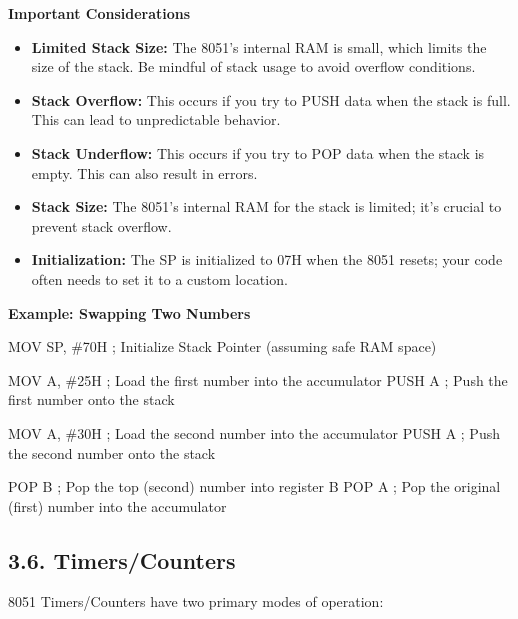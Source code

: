 \documentclass[
]{article}
\newenvironment{Shaded}{}{}
\newcommand{\NormalTok}[1]{#1}
\begin{document}
\textbf{Important Considerations}

\begin{itemize}
\item
  \textbf{Limited Stack Size:} The 8051's internal RAM is small, which
  limits the size of the stack. Be mindful of stack usage to avoid
  overflow conditions.
\item
  \textbf{Stack Overflow:} This occurs if you try to PUSH data when the
  stack is full. This can lead to unpredictable behavior.
\item
  \textbf{Stack Underflow:} This occurs if you try to POP data when the
  stack is empty. This can also result in errors.
\end{itemize}

\begin{itemize}
\item
  \textbf{Stack Size:} The 8051's internal RAM for the stack is limited;
  it's crucial to prevent stack overflow.
\item
  \textbf{Initialization:} The SP is initialized to 07H when the 8051
  resets; your code often needs to set it to a custom location.
\end{itemize}

\textbf{Example: Swapping Two Numbers}

\begin{Shaded}
\begin{Highlighting}[]
\NormalTok{MOV SP, \#70H   ; Initialize Stack Pointer (assuming safe RAM space)}

\NormalTok{MOV A, \#25H    ; Load the first number into the accumulator}
\NormalTok{PUSH A         ; Push the first number onto the stack}

\NormalTok{MOV A, \#30H    ; Load the second number into the accumulator}
\NormalTok{PUSH A         ; Push the second number onto the stack}

\NormalTok{POP B         ; Pop the top (second) number into register B}
\NormalTok{POP A          ; Pop the original (first) number into the accumulator}
\end{Highlighting}
\end{Shaded}

\hypertarget{36-timerscounters}{%
\subsection{3.6. Timers/Counters}\label{36-timerscounters}}

8051 Timers/Counters have two primary modes of operation:
\end{document}
